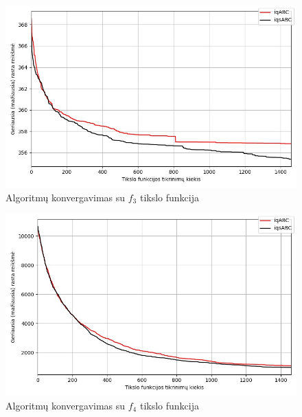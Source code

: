 \documentclass{VUMIFPSmagistrinis}
\begin{document}
\begin{landscape}
\begin{multicols}{2}
\begin{figure}[H]
    \centering
    \includegraphics[scale=0.5]{img/2kg/f3.jpg}
    \caption{Algoritmų konvergavimas su $f_{3}$ tikslo funkcija}
    \label{img:vkonf3}
\end{figure}

\begin{figure}[H]
    \centering
    \includegraphics[scale=0.5]{img/2kg/f4.jpg}
    \caption{Algoritmų konvergavimas su $f_{4}$ tikslo funkcija}
    \label{img:vkonf4}
\end{figure}





\end{multicols}
\begin{multicols}{2}



\end{multicols}
\end{landscape}
\end{document}
